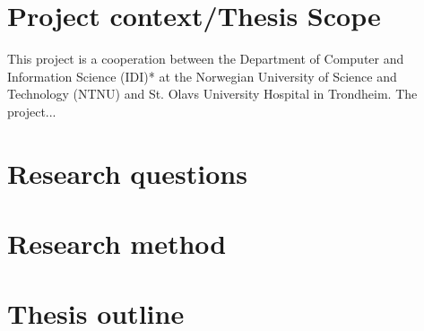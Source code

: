 \section{Project context/Thesis Scope}
This project is a cooperation between the Department of Computer and Information Science (IDI)* at the Norwegian University of Science and Technology (NTNU) and St. Olavs University Hospital in Trondheim. The project...

\section{Research questions}



\section{Research method}

\section{Thesis outline}
